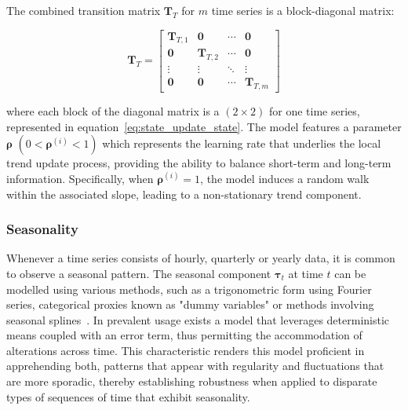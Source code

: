     The combined transition matrix $\bm{T}_T$ for $m$ time series is a block-diagonal matrix:

    \begin{equation}
        \mathbf{T}_T=
            \left[
                \begin{array}{cccc}
                    \mathbf{T}_{T, 1} & \mathbf{0}        & \cdots & \mathbf{0} \\
                    \mathbf{0}        & \mathbf{T}_{T, 2} & \cdots & \mathbf{0} \\
                    \vdots            & \vdots            & \ddots & \vdots     \\
                    \mathbf{0}        & \mathbf{0}        & \cdots & \mathbf{T}_{T, m}
                \end{array}
            \right]
        \label{eq:state_transition_mv}
    \end{equation}

    where each block of the diagonal matrix is a $(2 \times 2)$ for one time series, represented in equation~\ref{eq:state_update_state}.
    The model features a parameter $\bm{\rho}$ $(0 < \bm{\rho}^{(i)} < 1)$ which represents the learning rate that underlies the local trend
    update process, providing the ability to balance short-term and long-term information.
    Specifically, when $\bm{\rho}^{(i)} = 1$, the model induces a random walk within the associated slope,
    leading to a non-stationary trend component.

\subsubsection{Seasonality}
    \label{sec:seasonality_component}

    Whenever a time series consists of hourly, quarterly or yearly data, it is common to observe a seasonal pattern.
    The seasonal component $\bm{\tau}_{t}$ at time $t$ can be modelled using various methods,
    such as a trigonometric form using Fourier series, categorical proxies known as "dummy variables"
    or methods involving seasonal splines~\cite{proietti_seasonality_2023}.
    In prevalent usage exists a model that leverages deterministic means coupled with an error term,
    thus permitting the accommodation of alterations across time.
    This characteristic renders this model proficient in apprehending both,
    patterns that appear with regularity and fluctuations that are more sporadic,
    thereby establishing robustness when applied to disparate types of sequences of time that exhibit seasonality.

